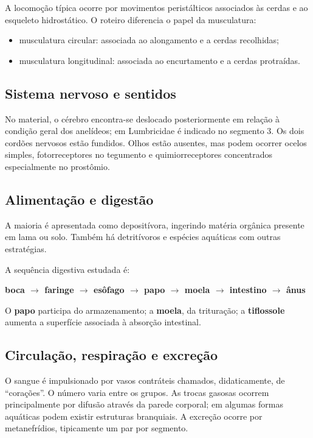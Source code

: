\documentclass[a4paper,12pt]{article}
\newcommand{\termo}[1]{\textbf{#1}}
\begin{document}
A locomoção típica ocorre por movimentos peristálticos associados às cerdas e ao esqueleto hidrostático. O roteiro diferencia o papel da musculatura:

\begin{itemize}
  \item musculatura circular: associada ao alongamento e a cerdas recolhidas;
  \item musculatura longitudinal: associada ao encurtamento e a cerdas protraídas.
\end{itemize}

\subsection{Sistema nervoso e sentidos}

No material, o cérebro encontra-se deslocado posteriormente em relação à condição geral dos anelídeos; em Lumbricidae é indicado no segmento 3. Os dois cordões nervosos estão fundidos. Olhos estão ausentes, mas podem ocorrer ocelos simples, fotorreceptores no tegumento e quimiorreceptores concentrados especialmente no prostômio.

\subsection{Alimentação e digestão}

A maioria é apresentada como depositívora, ingerindo matéria orgânica presente em lama ou solo. Também há detritívoros e espécies aquáticas com outras estratégias.

A sequência digestiva estudada é:

\begin{center}
\textbf{boca $\rightarrow$ faringe $\rightarrow$ esôfago $\rightarrow$ papo $\rightarrow$ moela $\rightarrow$ intestino $\rightarrow$ ânus}
\end{center}

O \termo{papo} participa do armazenamento; a \termo{moela}, da trituração; a \termo{tiflossole} aumenta a superfície associada à absorção intestinal.

\subsection{Circulação, respiração e excreção}

O sangue é impulsionado por vasos contráteis chamados, didaticamente, de ``corações''. O número varia entre os grupos. As trocas gasosas ocorrem principalmente por difusão através da parede corporal; em algumas formas aquáticas podem existir estruturas branquiais. A excreção ocorre por metanefrídios, tipicamente um par por segmento.
\end{document}
